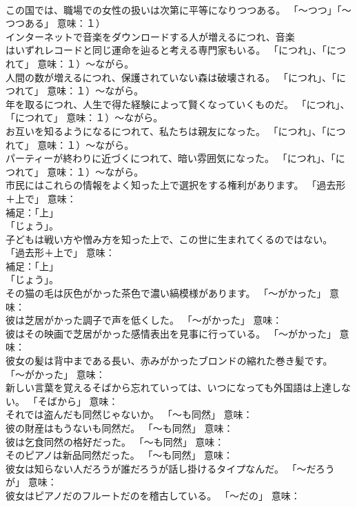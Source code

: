 \documentclass[8pt]{extreport}
\begin{document}
\begin{CJK}{UTF8}{min}
\\	この国では、職場での女性の扱いは次第に平等になりつつある。	「～つつ」「～つつある」 意味：１）
\\	インターネットで音楽をダウンロードする人が増えるにつれ、音楽
\\	はいずれレコードと同じ運命を辿ると考える専門家もいる。	「につれ」、「につれて」 意味：１）～ながら。	
\\	人間の数が増えるにつれ、保護されていない森は破壊される。	「につれ」、「につれて」 意味：１）～ながら。	
\\	年を取るにつれ、人生で得た経験によって賢くなっていくものだ。	「につれ」、「につれて」 意味：１）～ながら。	
\\	お互いを知るようになるにつれて、私たちは親友になった。	「につれ」、「につれて」 意味：１）～ながら。	
\\	パーティーが終わりに近づくにつれて、暗い雰囲気になった。	「につれ」、「につれて」 意味：１）～ながら。	
\\	市民にはこれらの情報をよく知った上で選択をする権利があります。	「過去形＋上で」 意味：
\\	補足：「上」
\\	「じょう」。	
\\	子どもは戦い方や憎み方を知った上で、この世に生まれてくるのではない。	「過去形＋上で」 意味：
\\	補足：「上」
\\	「じょう」。	
\\	その猫の毛は灰色がかった茶色で濃い縞模様があります。	「～がかった」 意味：~
\\	彼は芝居がかった調子で声を低くした。	「～がかった」 意味：~
\\	彼はその映画で芝居がかった感情表出を見事に行っている。	「～がかった」 意味：~
\\	彼女の髪は背中まである長い、赤みがかったブロンドの縮れた巻き髪です。	「～がかった」 意味：~
\\	新しい言葉を覚えるそばから忘れていっては、いつになっても外国語は上達しない。	「そばから」 意味：
\\	それでは盗んだも同然じゃないか。	「～も同然」 意味：
\\	彼の財産はもうないも同然だ。	「～も同然」 意味：
\\	彼は乞食同然の格好だった。	「～も同然」 意味：
\\	そのピアノは新品同然だった。	「～も同然」 意味：
\\	彼女は知らない人だろうが誰だろうが話し掛けるタイプなんだ。	「～だろうが」 意味：
\\	彼女はピアノだのフルートだのを稽古している。	「～だの」 意味：

\end{CJK}
\end{document}
